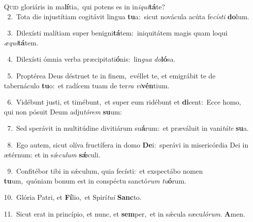 \lettrine{\initial\textcolor{\initialcolor}{Q}}{uid} gloriáris in ma\-\textbf{lí}\-tia,~\star qui potens es in in\-\textit{i}\-\textit{qui}\textbf{tá}te?\\
{\numbfont\textcolor{\numbcolor}{~2.}}~Tota die injustítiam cogitávit lingua \textbf{tu}\-a:~\star sicut novácula acúta fe\-\textit{cís}\-\textit{ti} \textbf{do}\-lum.\par
{\numbfont\textcolor{\numbcolor}{~3.}}~Dilexísti malítiam super benigni\-\textbf{tá}\-tem:~\star iniquitátem magis quam loqui \textit{æ}\-\textit{qui}\textbf{tá}tem.\par
{\numbfont\textcolor{\numbcolor}{~4.}}~Dilexísti ómnia verba præcipitati\-\textbf{ó}\-nis:~\star lin\textit{gua} \textit{do}\-\textbf{ló}sa.\par
{\numbfont\textcolor{\numbcolor}{~5.}}~Proptérea Deus déstruet te in finem,~\dagger evéllet te, et emigrábit te de tabernáculo \textbf{tu}\-o:~\star et radícem tuam de ter\textit{ra} \textit{vi}\-\textbf{vén}tium.\par
{\numbfont\textcolor{\numbcolor}{~6.}}~Vidébunt justi, et timébunt,~\dagger et super eum ridébunt et \textbf{di}\-cent:~\star Ecce homo, qui non pósuit Deum adju\-\textit{tó}\-\textit{rem} \textbf{su}\-um:\par
{\numbfont\textcolor{\numbcolor}{~7.}}~Sed sperávit in multitúdine divitiárum su\-\textbf{á}\-rum:~\star et præváluit in vani\-\textit{tá}\-\textit{te} \textbf{su}\-a.\par
{\numbfont\textcolor{\numbcolor}{~8.}}~Ego autem, sicut olíva fructífera in domo \textbf{De}\-i:~\star sperávi in misericórdia Dei in ætérnum: et in sǽ\-\textit{cu}\-\textit{lum} \textbf{sǽ}\-culi.\par
{\numbfont\textcolor{\numbcolor}{~9.}}~Confitébor tibi in sǽculum, quia fecísti:~\dagger et exspectábo nomen \textbf{tu}\-um,~\star quóniam bonum est in conspéctu sanctó\textit{rum} \textit{tu}\-\textbf{ó}rum.\par
{\numbfont\textcolor{\numbcolor}{10.}}~Glória Patri, et \textbf{Fí}\-lio,~\star et Spirí\-\textit{tu}\-\textit{i} \textbf{Sanc}\-to.\par
{\numbfont\textcolor{\numbcolor}{11.}}~Sicut erat in princípio, et nunc, et \textbf{sem}\-per,~\star et in sǽcula sæcu\-\textit{ló}\-\textit{rum}. \textbf{A}\-men.\par
